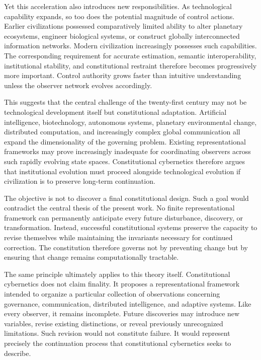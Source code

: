 \documentclass[12pt,a4paper]{article}
\begin{document}
Yet this acceleration also introduces new responsibilities. As technological capability expands, so too does the potential magnitude of control actions. Earlier civilizations possessed comparatively limited ability to alter planetary ecosystems, engineer biological systems, or construct globally interconnected information networks. Modern civilization increasingly possesses such capabilities. The corresponding requirement for accurate estimation, semantic interoperability, institutional stability, and constitutional restraint therefore becomes progressively more important. Control authority grows faster than intuitive understanding unless the observer network evolves accordingly.

This suggests that the central challenge of the twenty-first century may not be technological development itself but constitutional adaptation. Artificial intelligence, biotechnology, autonomous systems, planetary environmental change, distributed computation, and increasingly complex global communication all expand the dimensionality of the governing problem. Existing representational frameworks may prove increasingly inadequate for coordinating observers across such rapidly evolving state spaces. Constitutional cybernetics therefore argues that institutional evolution must proceed alongside technological evolution if civilization is to preserve long-term continuation.

The objective is not to discover a final constitutional design. Such a goal would contradict the central thesis of the present work. No finite representational framework can permanently anticipate every future disturbance, discovery, or transformation. Instead, successful constitutional systems preserve the capacity to revise themselves while maintaining the invariants necessary for continued correction. The constitution therefore governs not by preventing change but by ensuring that change remains computationally tractable.

The same principle ultimately applies to this theory itself. Constitutional cybernetics does not claim finality. It proposes a representational framework intended to organize a particular collection of observations concerning governance, communication, distributed intelligence, and adaptive systems. Like every observer, it remains incomplete. Future discoveries may introduce new variables, revise existing distinctions, or reveal previously unrecognized limitations. Such revision would not constitute failure. It would represent precisely the continuation process that constitutional cybernetics seeks to describe.
\end{document}
